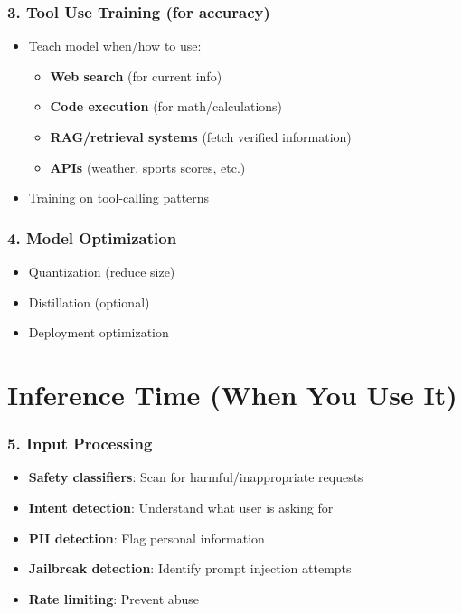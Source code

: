 \subsubsection{3. Tool Use Training {} (for accuracy)}
\begin{itemize}[leftmargin=*]
    \item Teach model when/how to use:
    \begin{itemize}
        \item \textbf{Web search} (for current info)
        \item \textbf{Code execution} (for math/calculations)
        \item \textbf{RAG/retrieval systems} (fetch verified information)
        \item \textbf{APIs} (weather, sports scores, etc.)
    \end{itemize}
    \item Training on tool-calling patterns
\end{itemize}

\subsubsection{4. Model Optimization}
\begin{itemize}[leftmargin=*]
    \item Quantization (reduce size)
    \item Distillation (optional)
    \item Deployment optimization
\end{itemize}

\section{Inference Time (When You Use It)}

\subsubsection{5. Input Processing }
\begin{itemize}[leftmargin=*]
    \item \textbf{Safety classifiers}: Scan for harmful/inappropriate requests
    \item \textbf{Intent detection}: Understand what user is asking for
    \item \textbf{PII detection}: Flag personal information
    \item \textbf{Jailbreak detection}: Identify prompt injection attempts
    \item \textbf{Rate limiting}: Prevent abuse
\end{itemize}

